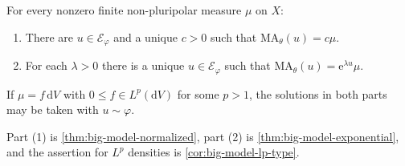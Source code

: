\begin{theorem}
\label{thm:li-general-measure}
For every nonzero finite non-pluripolar measure $\mu$ on $X$:
\begin{enumerate}
\item There are $u\in\mathcal E_\varphi$ and a unique $c>0$ such that $\mathrm{MA}_\theta(u)=c\mu$.
\item For each $\lambda>0$ there is a unique $u\in\mathcal E_\varphi$ such that $\mathrm{MA}_\theta(u)=\mathrm{e}^{\lambda u}\mu$.
\end{enumerate}
If $\mu=f\,\mathrm{d}V$ with $0\leq f\in L^p(\mathrm{d}V)$ for some $p>1$, the solutions in both parts may be taken with $u\sim\varphi$.
\end{theorem}

Part (1) is \cref{thm:big-model-normalized}, part (2) is \cref{thm:big-model-exponential}, and the assertion for $L^p$ densities is \cref{cor:big-model-lp-type}.





















\par\endgroup
